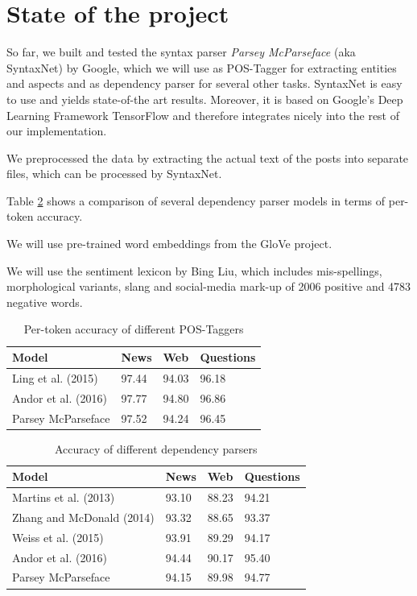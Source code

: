 \documentclass[10pt,a4paper]{article}
\begin{document}
	\section{State of the project}
	So far, we built and tested the syntax parser \textit{Parsey McParseface} (aka SyntaxNet) by Google, which we will use as POS-Tagger for extracting entities and aspects and as dependency parser for several other tasks. SyntaxNet is easy to use and yields state-of-the art results. Moreover, it is based on Google's Deep Learning Framework TensorFlow and therefore integrates nicely into the rest of our implementation.
	
	We preprocessed the data by extracting the actual text of the posts into separate files, which can be processed by SyntaxNet.
	
	Table \ref{tab:parseraccuracy} shows a comparison of several dependency parser models in terms of per-token accuracy.
	
	We will use pre-trained word embeddings from the GloVe project.
	
	We will use the sentiment lexicon by Bing Liu, which includes mis-spellings, morphological variants, slang and social-media mark-up of 2006 positive and 4783 negative words.
	
	\begin{table}[h]
		\centering
		\caption{Per-token accuracy of different POS-Taggers}
		\label{tab:posaccuracy}
		\begin{tabular}{|l|l|l|l|}
			\hline
			Model & News & Web & Questions \\
			\hline
			Ling et al. (2015) & 97.44 & 94.03 & 96.18 \\
			\hline
			Andor et al. (2016) & 97.77 & 94.80 & 96.86 \\
			\hline
			Parsey McParseface & 97.52 & 94.24 & 96.45 \\
			\hline
		\end{tabular}
	\end{table}
	
	\begin{table}[h]
		\centering
		\caption{Accuracy of different dependency parsers}
		\label{tab:parseraccuracy}
		\begin{tabular}{|l|l|l|l|}
			\hline
			Model & News & Web & Questions \\
			\hline
			Martins et al. (2013) & 93.10 & 88.23 & 94.21 \\
			\hline
			Zhang and McDonald (2014) & 93.32 & 88.65 & 93.37 \\
			\hline
			Weiss et al. (2015) & 93.91 & 89.29 & 94.17 \\
			\hline
			Andor et al. (2016) & 94.44 & 90.17 & 95.40 \\
			\hline
			Parsey McParseface & 94.15 & 89.98 & 94.77 \\
			\hline
		\end{tabular}
	\end{table}
\end{document}
